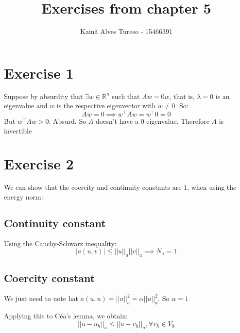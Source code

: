 \documentclass{article}
\title{Exercises from chapter 5}
\author{Kainã Alves Tureso - 15466391}
\begin{document}
    \maketitle

    \section*{Exercise 1}

    Suppose by absurdity that $\exists w \in \mathbb{R}^n$ such that $Aw= 0w$, that is, $\lambda = 0$ is an eigenvalue and $w$ is the respective eigenvector with $w \ne 0$. So:
    \[
        Aw = 0 \implies w^\top A w = w^\top 0 = 0 
    \]
    But $w^\top A w > 0 $. Absurd. So $A$ doesn't have a $0$ eigenvalue. Therefore $A$ is invertible

    \section*{Exercise 2}
    We can show that the coercity and continuity constants are $1$, when using the energy norm:

    \subsection*{Continuity constant}
    Using the Cauchy-Schwarz inequality:
    \[
        |a(u,v)| \le ||u||_a ||v||_a \implies N_a = 1
    \]

    \subsection*{Coercity constant}
    We just need to note hat $a(u,u) = ||u||^2_a = \alpha ||u||^2_a$. So $\alpha = 1$

    Applying this to Céa's lemma, we obtain:
    \[
        ||u - u_h||_a \le ||u- v_h||_a, \forall v_h \in V_h
    \]
\end{document}
